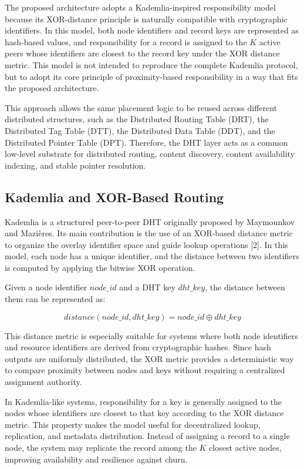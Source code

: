 \documentclass[12pt,a4paper]{article}
\begin{document}
The proposed architecture adopts a Kademlia-inspired responsibility model because
its XOR-distance principle is naturally compatible with cryptographic identifiers.
In this model, both node identifiers and record keys are represented as hash-based
values, and responsibility for a record is assigned to the \(K\) active peers whose
identifiers are closest to the record key under the XOR distance metric. This model
is not intended to reproduce the complete Kademlia protocol, but to adopt its core
principle of proximity-based responsibility in a way that fits the proposed
architecture.

This approach allows the same placement logic to be reused across different
distributed structures, such as the Distributed Routing Table (DRT), the
Distributed Tag Table (DTT), the Distributed Data Table (DDT), and the Distributed
Pointer Table (DPT). Therefore, the DHT layer acts as a common low-level substrate
for distributed routing, content discovery, content availability indexing, and
stable pointer resolution.

\subsection{Kademlia and XOR-Based Routing}

Kademlia is a structured peer-to-peer DHT originally proposed by Maymounkov and
Mazi\`eres. Its main contribution is the use of an XOR-based distance metric to
organize the overlay identifier space and guide lookup operations
[2]. In this model, each node has a unique identifier,
and the distance between two identifiers is computed by applying the bitwise XOR
operation.

Given a node identifier \(node\_id\) and a DHT key \(dht\_key\), the distance between
them can be represented as:

\[
distance(node\_id, dht\_key) = node\_id \oplus dht\_key
\]

This distance metric is especially suitable for systems where both node identifiers
and resource identifiers are derived from cryptographic hashes. Since hash outputs
are uniformly distributed, the XOR metric provides a deterministic way to compare
proximity between nodes and keys without requiring a centralized assignment
authority.

In Kademlia-like systems, responsibility for a key is generally assigned to the
nodes whose identifiers are closest to that key according to the XOR distance
metric. This property makes the model useful for decentralized lookup, replication,
and metadata distribution. Instead of assigning a record to a single node, the
system may replicate the record among the \(K\) closest active nodes, improving
availability and resilience against churn.
\end{document}
